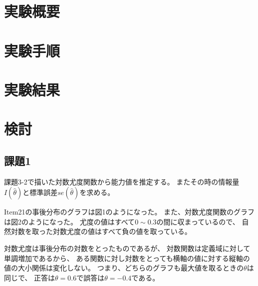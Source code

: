 \documentclass[12pt]{jarticle}
\begin{document}



\section{実験概要}
\section{実験手順}

\section{実験結果}
\section{検討}
\subsection{課題1}
\begin{shadebox}
    課題3-2で描いた対数尤度関数から能力値を推定する。
    またその時の情報量$I(\hat{\theta})$と標準誤差$se(\hat{\theta})$を求める。
\end{shadebox}

\clearpage

Item21の事後分布のグラフは図1のようになった。
また、対数尤度関数のグラフは図2のようになった。
尤度の値はすべて$0\sim 0.3$の間に収まっているので、
自然対数を取った対数尤度の値はすべて負の値を取っている。

対数尤度は事後分布の対数をとったものであるが、
対数関数は定義域に対して単調増加であるから、
ある関数に対し対数をとっても横軸の値に対する縦軸の値の大小関係は変化しない。
つまり、どちらのグラフも最大値を取るときの$\theta$は同じで、
正答は$\theta=0.6$で誤答は$\theta=-0.4$である。
\end{document}
